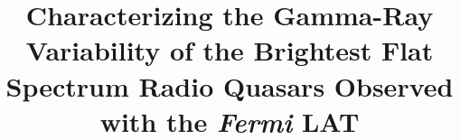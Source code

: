 \documentclass[twocolumn]{aastex62}
\begin{document}
\title{Characterizing the Gamma-Ray Variability of the Brightest Flat Spectrum Radio Quasars Observed with the \emph{Fermi} LAT}


\end{document}
